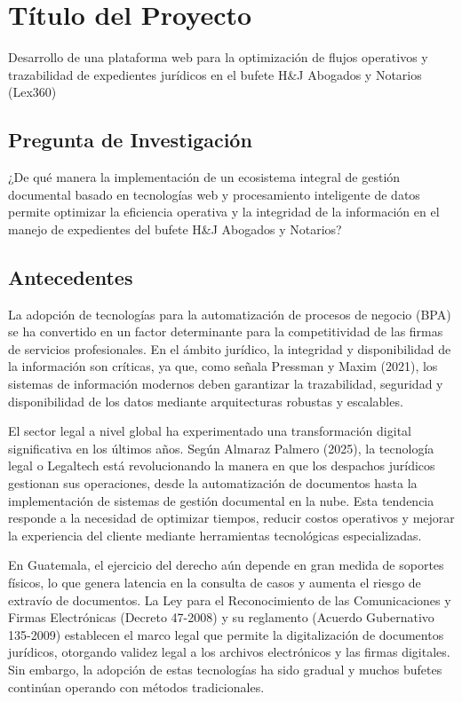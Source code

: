 \documentclass[12pt, letterpaper]{article}
\begin{document}
\section{Título del Proyecto}
Desarrollo de una plataforma web para la optimización de flujos operativos y trazabilidad de expedientes jurídicos en el bufete H\&J Abogados y Notarios (Lex360)

\subsection{Pregunta de Investigación}
¿De qué manera la implementación de un ecosistema integral de gestión documental basado en tecnologías web y procesamiento inteligente de datos permite optimizar la eficiencia operativa y la integridad de la información en el manejo de expedientes del bufete H\&J Abogados y Notarios?

\subsection{Antecedentes}
La adopción de tecnologías para la automatización de procesos de negocio (BPA) se ha convertido en un factor determinante para la competitividad de las firmas de servicios profesionales. En el ámbito jurídico, la integridad y disponibilidad de la información son críticas, ya que, como señala Pressman y Maxim (2021), los sistemas de información modernos deben garantizar la trazabilidad, seguridad y disponibilidad de los datos mediante arquitecturas robustas y escalables.

El sector legal a nivel global ha experimentado una transformación digital significativa en los últimos años. Según Almaraz Palmero (2025), la tecnología legal o Legaltech está revolucionando la manera en que los despachos jurídicos gestionan sus operaciones, desde la automatización de documentos hasta la implementación de sistemas de gestión documental en la nube. Esta tendencia responde a la necesidad de optimizar tiempos, reducir costos operativos y mejorar la experiencia del cliente mediante herramientas tecnológicas especializadas.

En Guatemala, el ejercicio del derecho aún depende en gran medida de soportes físicos, lo que genera latencia en la consulta de casos y aumenta el riesgo de extravío de documentos. La Ley para el Reconocimiento de las Comunicaciones y Firmas Electrónicas (Decreto 47-2008) y su reglamento (Acuerdo Gubernativo 135-2009) establecen el marco legal que permite la digitalización de documentos jurídicos, otorgando validez legal a los archivos electrónicos y las firmas digitales. Sin embargo, la adopción de estas tecnologías ha sido gradual y muchos bufetes continúan operando con métodos tradicionales.
\end{document}
